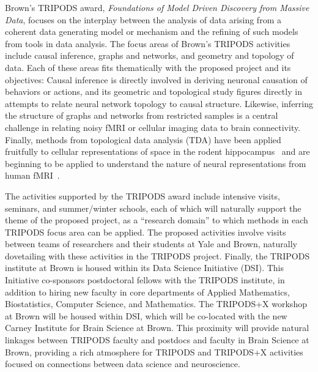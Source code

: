 
Brown's TRIPODS award, \emph{Foundations of Model Driven Discovery from Massive Data}, focuses on the interplay between the analysis of data arising from a coherent data generating model or mechanism and the refining of such models from tools in data analysis. The focus areas of Brown's TRIPODS activities include causal inference, graphs and networks, and geometry and topology of data. Each of these areas fits thematically with the proposed project and its objectives: Causal inference is directly involved in deriving neuronal causation of behaviors or actions, and its geometric and topological study figures directly in attempts to relate neural network topology to causal structure. Likewise, inferring the structure of graphs and networks from restricted samples is a central challenge in relating noisy fMRI or cellular imaging data to brain connectivity. Finally, methods from topological data analysis (TDA) have been applied fruitfully to cellular representations of space in the rodent hippocampus~\citep{Dabaghian:2012} and are beginning to be applied to understand the nature of neural representations from human fMRI~\citep{Saggar:2018}.

The activities supported by the TRIPODS award include intensive visits, seminars, and summer/winter schools, each of which will naturally support the theme of the proposed project, as a ``research domain'' to which methods in each TRIPODS focus area can be applied. The proposed activities involve visits between teams of researchers and their students at Yale and Brown, naturally dovetailing with these activities in the TRIPODS project. Finally, the TRIPODS institute at Brown is housed within its Data Science Initiative (DSI). This Initiative co-sponsors postdoctoral fellows with the TRIPODS institute, in addition to hiring new faculty in core departments of Applied Mathematics, Biostatistics, Computer Science, and Mathematics. The TRIPODS+X workshop at Brown will be housed within DSI, which will be co-located with the new Carney Institute for Brain Science at Brown. This proximity will provide natural linkages between TRIPODS faculty and postdocs and faculty in Brain Science at Brown, providing a rich atmosphere for TRIPODS and TRIPODS+X activities focused on connections between data science and neuroscience.
